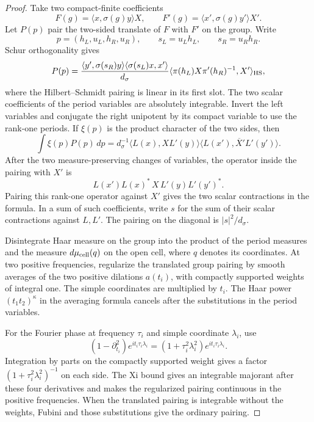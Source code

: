 \begin{proof}
Take two compact-finite coefficients
\[
 F(g)=\langle x,\sigma(g)y\rangle X,\qquad
 F'(g)=\langle x',\sigma(g)y'\rangle X'.
\]
Let \(P(p)\) pair the two-sided translate of \(F\) with \(F'\)
on the group. Write
\[
 p=(h_L,u_L,h_R,u_R),\qquad s_L=u_Lh_L,\qquad s_R=u_Rh_R.
\]
Schur orthogonality gives
\[
 P(p)=\frac{\langle y',\sigma(s_R)y\rangle
                 \langle\sigma(s_L)x,x'\rangle}{d_\sigma}
      \langle\pi(h_L)X\pi'(h_R)^{-1},X'\rangle_{\rm HS},
\]
where the Hilbert--Schmidt pairing is linear in its first slot.
The two scalar coefficients of the period variables are absolutely
integrable. Invert the left variables and conjugate the right
unipotent by its compact variable to use the rank-one periods.
If \(\xi(p)\) is the product character of the two sides, then
\[
 \int \xi(p)P(p)\,dp
    =d_\sigma^{-1}\langle L(x),XL'(y)\rangle
                \overline{\langle L(x'),X'L'(y')\rangle}.
\]
After the two measure-preserving changes of variables, the
operator inside the pairing with \(X'\) is
\[
       L(x')L(x)^*\,X\,L'(y)L'(y')^* .
\]
Pairing this rank-one operator against \(X'\) gives the two scalar
contractions in the formula. In a sum of such coefficients, write \(s\) for
the sum of their scalar contractions against \(L,L'\).
The pairing on the diagonal is \(|s|^2/d_\sigma\).


Disintegrate Haar measure on the group into the product of the period measures and the measure \(d\mu_{\rm cell}(q)\) on the open cell, where \(q\) denotes its coordinates. At two positive frequencies,
regularize the translated group pairing by smooth averages of
the two positive dilations \(a(t_i)\), with compactly supported
weights of integral one. The simple coordinates are multiplied
by \(t_i\). The Haar power \((t_1t_2)^\kappa\) in the averaging
formula cancels after the substitutions in the period variables.


For the Fourier phase at frequency \(\tau_i\) and simple coordinate \(\lambda_i\), use
\[
 (1-\partial_{t_i}^2)e^{it_i\tau_i\lambda_i}
 =(1+\tau_i^2\lambda_i^2)e^{it_i\tau_i\lambda_i}.
\]
Integration by parts on the compactly supported weight gives
a factor \((1+\tau_i^2\lambda_i^2)^{-1}\) on each side. The Xi bound gives
an integrable majorant after these four derivatives and makes
the regularized pairing continuous in the positive frequencies.
When the translated pairing is integrable without the weights,
Fubini and those substitutions give the ordinary pairing.


\end{proof}
